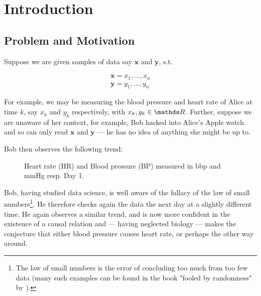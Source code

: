 
\chapter{Introduction}

\section{Problem and Motivation}

Suppose we are given samples of data say $\mathbf{x}$ and $\mathbf{y}$, s.t.

\begin{align*}
    \mathbf{x} = x_1, ..., x_n  \\
    \mathbf{y} = y_1, ..., y_n 
\end{align*}

For example, we may be measuring the blood pressure and heart rate of Alice at time $k$, 
say $x_k$ and $y_k$ respectively, with $x_k, y_k \in \R$. Further, suppose we are unaware of her context, for example,
Bob hacked into Alice's Apple watch and so can only read $\mathbf{x}$ and $\mathbf{y}$ --- he has no idea of 
anything she might be up to.

Bob then observes the following trend:

\begin{figure}[htb]
    \centering
    \caption{Heart rate (HR) and Blood pressure (BP) measured in bbp and mmHg resp. Day 1.}
\end{figure}

Bob, having studied data science, is well aware of the fallacy of the law of small numbers\footnote{
    The law of small numbers is the error of concluding too much from too few data (many such examples 
    can be found in the book "fooled by randomness" by \cite{taleb}).}. 
 He therefore checks again the data the next day at a slightly different time. He again observes 
a similar trend, and is now more confident in the existence of a causal relation and --- having neglected biology --- 
makes the conjecture that either blood pressure causes heart rate, or 
perhaps the other way around. 

